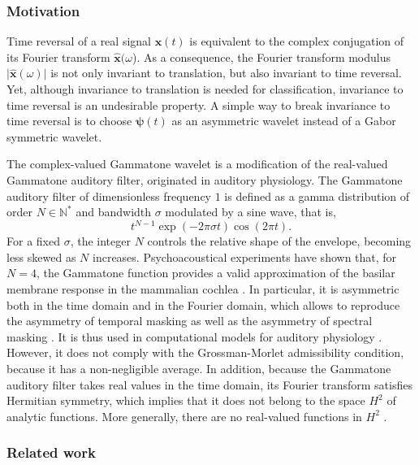\documentclass[smallextended]{svjour3}
\begin{document}
\subsubsection*{Motivation}
Time reversal of a real signal $\boldsymbol{x}(t)$ is equivalent
to the complex conjugation of its Fourier transform $\boldsymbol{\widehat{x}}(\omega$).
As a consequence, the Fourier transform modulus $\vert\boldsymbol{\widehat{x}}(\omega)\vert$
is not only invariant to translation, but also invariant to time reversal.
Yet, although invariance to translation is needed for classification,
invariance to time reversal is an undesirable property.
A simple way to break invariance to time reversal is to choose $\boldsymbol{\psi}(t)$
as an asymmetric wavelet instead of a Gabor symmetric wavelet.

The complex-valued Gammatone wavelet is a modification of the real-valued
Gammatone auditory filter, originated in auditory physiology. The
Gammatone auditory filter of dimensionless frequency $1$ is defined
as a gamma distribution of order $N\in\mathbb{N}^{*}$ and bandwidth
$\sigma$ modulated by a sine wave, that is, 
\[
t^{N-1}\exp(-2\pi\sigma t)\cos(2\pi t).
\]
For a fixed $\sigma$, the integer $N$ controls the relative shape
of the envelope, becoming less skewed as $N$ increases. Psychoacoustical
experiments have shown that, for $N=4$, the Gammatone function provides
a valid approximation of the basilar membrane response in the mammalian
cochlea \cite{Flanagan1960,Patterson1976,Lyon2010}. In particular,
it is asymmetric both in the time domain and in the Fourier domain,
which allows to reproduce the asymmetry of temporal masking as well
as the asymmetry of spectral masking \cite{Fastl2007}. It is thus
used in computational models for auditory physiology \cite{Pressnitzer2005}.
However, it does not comply with the Grossman-Morlet admissibility
condition, because it has a non-negligible average. In addition, because
the Gammatone auditory filter takes real values in the time domain,
its Fourier transform satisfies Hermitian symmetry, which implies
that it does not belong to the space $H^{2}$ of analytic functions.
More generally, there are no real-valued functions in $H^{2}$ \cite{Grossmann1984}.

\subsubsection*{Related work}
\end{document}

